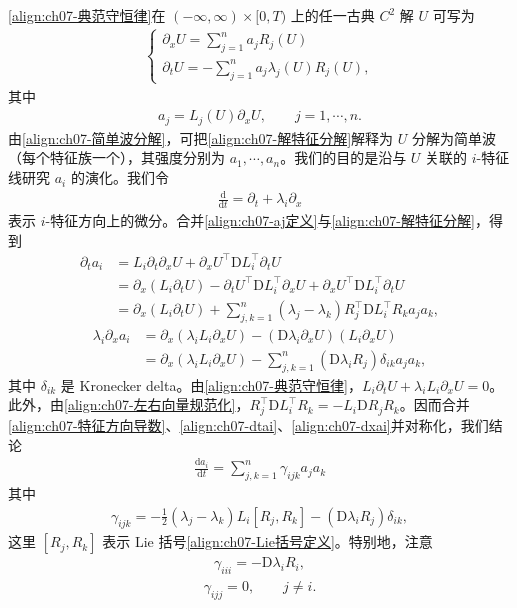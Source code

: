 \documentclass[../../main.tex]{subfiles}
\begin{document}
\eqref{align:ch07-典范守恒律}在 $(-\infty,\infty)\times[0,T)$ 上的任一古典 $C^2$ 解 $U$ 可写为
\begin{align}
\begin{cases}
\partial_x U=\displaystyle\sum_{j=1}^n a_j R_j(U)\\
\partial_t U=-\displaystyle\sum_{j=1}^n a_j\lambda_j(U)R_j(U),
\end{cases}
\label{align:ch07-解特征分解}
\end{align}
其中
\begin{align}
a_j=L_j(U)\partial_x U,\qquad j=1,\cdots,n.
\label{align:ch07-aj定义}
\end{align}
由\eqref{align:ch07-简单波分解}，可把\eqref{align:ch07-解特征分解}解释为 $U$ 分解为简单波（每个特征族一个），其强度分别为 $a_1,\cdots,a_n$。我们的目的是沿与 $U$ 关联的 $i$-特征线研究 $a_i$ 的演化。我们令
\begin{align}
\frac{\mathrm{d}}{\mathrm{d}t}=\partial_t+\lambda_i\partial_x
\label{align:ch07-特征方向导数}
\end{align}
表示 $i$-特征方向上的微分。合并\eqref{align:ch07-aj定义}与\eqref{align:ch07-解特征分解}，得到
\begin{align}
\partial_t a_i&=L_i\partial_t\partial_x U+\partial_x U^\top\mathrm{D}L_i^\top\partial_t U\nonumber\\
&=\partial_x(L_i\partial_t U)-\partial_t U^\top\mathrm{D}L_i^\top\partial_x U+\partial_x U^\top\mathrm{D}L_i^\top\partial_t U\nonumber\\
&=\partial_x(L_i\partial_t U)+\sum_{j,k=1}^n(\lambda_j-\lambda_k)R_j^\top\mathrm{D}L_i^\top R_k a_j a_k,
\label{align:ch07-dtai}
\end{align}
\begin{align}
\lambda_i\partial_x a_i&=\partial_x(\lambda_i L_i\partial_x U)-(\mathrm{D}\lambda_i\partial_x U)(L_i\partial_x U)\nonumber\\
&=\partial_x(\lambda_i L_i\partial_x U)-\sum_{j,k=1}^n(\mathrm{D}\lambda_i R_j)\delta_{ik}a_j a_k,
\label{align:ch07-dxai}
\end{align}
其中 $\delta_{ik}$ 是 Kronecker delta。由\eqref{align:ch07-典范守恒律}，$L_i\partial_t U+\lambda_i L_i\partial_x U=0$。此外，由\eqref{align:ch07-左右向量规范化}，$R_j^\top\mathrm{D}L_i^\top R_k=-L_i\mathrm{D}R_j R_k$。因而合并\eqref{align:ch07-特征方向导数}、\eqref{align:ch07-dtai}、\eqref{align:ch07-dxai}并对称化，我们结论
\begin{align}
\frac{\mathrm{d}a_i}{\mathrm{d}t}=\sum_{j,k=1}^n\gamma_{ijk}a_j a_k
\label{align:ch07-riccati}
\end{align}
其中
\begin{align}
\gamma_{ijk}=-\tfrac12(\lambda_j-\lambda_k)L_i[R_j,R_k]-(\mathrm{D}\lambda_i R_j)\delta_{ik},
\label{align:ch07-gamma}
\end{align}
这里 $[R_j,R_k]$ 表示 Lie 括号\eqref{align:ch07-Lie括号定义}。特别地，注意
\begin{align}
\gamma_{iii}=-\mathrm{D}\lambda_i R_i,
\label{align:ch07-gammaiii}
\end{align}
\begin{align}
\gamma_{ijj}=0,\qquad j\neq i.
\label{align:ch07-gammaijj}
\end{align}
\end{document}
